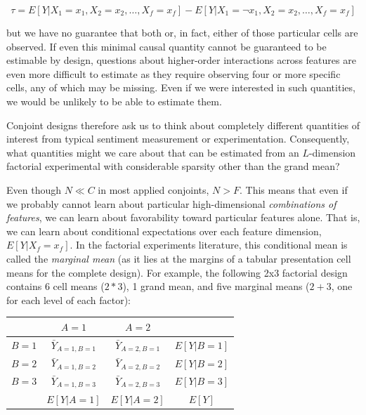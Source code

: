 \documentclass[a4paper,12pt]{article}\usepackage[]{graphicx}\usepackage[]{color}
\begin{document}
\begin{equation}
\tau = E[Y|X_1=x_1,X_2=x_2,\dots,X_f=x_f] - E[Y|X_1= \neg x_1,X_2=x_2,\dots,X_f=x_f]
\end{equation}

\noindent but we have no guarantee that both or, in fact, either of those particular cells are observed. If even this minimal causal quantity cannot be guaranteed to be estimable by design, questions about higher-order interactions across features are even more difficult to estimate as they require observing four or more specific cells, any of which may be missing. Even if we were interested in such quantities, we would be unlikely to be able to estimate them.

Conjoint designs therefore ask us to think about completely different quantities of interest from typical sentiment measurement or experimentation. Consequently, what quantities might we care about that can be estimated from an $L$-dimension factorial experimental with considerable sparsity other than the grand mean? 

Even though $N \ll C$ in most applied conjoints, $N > F$. This means that even if we probably cannot learn about particular high-dimensional \textit{combinations of features}, we can learn about favorability toward particular features alone. That is, we can learn about conditional expectations over each feature dimension, $E[Y|X_f=x_f]$. In the factorial experiments literature, this conditional mean is called the \textit{marginal mean} (as it lies at the margins of a tabular presentation cell means for the complete design). For example, the following 2x3 factorial design contains 6 cell means ($2*3$), 1 grand mean, and five marginal means ($2+3$, one for each level of each factor):

\begin{center}
\begin{tabular}{lccc}\toprule
 & $A = 1$ & $A = 2$ & \\ \midrule
$B = 1$ & $\bar{Y}_{A=1, B=1}$ & $\bar{Y}_{A=2, B=1}$ & $E[Y|B=1]$ \\
$B = 2$ & $\bar{Y}_{A=1, B=2}$ & $\bar{Y}_{A=2, B=2}$ & $E[Y|B=2]$ \\
$B = 3$ & $\bar{Y}_{A=1, B=3}$ & $\bar{Y}_{A=2, B=3}$ & $E[Y|B=3]$ \\ \midrule
 & $E[Y|A=1]$ & $E[Y|A=2]$ & $E[Y]$ \\ \bottomrule
\end{tabular}
\end{center}
\end{document}

